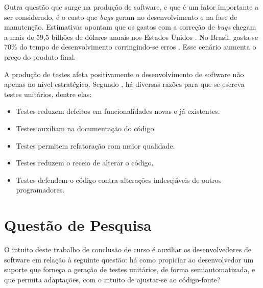 \par
\indent Outra questão que surge na produção de software, e que é um fator
importante a ser considerado, é o custo que \textit{bugs} geram no
desenvolvimento e na fase de manutenção. Estimativas apontam que os gastos
com a correção de \textit{bugs} chegam a mais de 59,5 bilhões de dólares
anuais nos Estados Unidos \cite{jantti2008}. No Brasil, gasta-se 70\% do
tempo de desenvolvimento corringindo-se erros \cite{janones2010}. Esse
cenário aumenta o preço do produto final.
\par
\indent A produção de testes afeta positivamente o desenvolvimento de
software não apenas no nível estratégico. Segundo ,
há diversas razões para que se escreva testes unitários, dentre elas:
\begin{itemize}
  \item Testes reduzem defeitos em funcionalidades novas e já existentes.

  \item Testes auxiliam na documentação do código.

  \item Testes permitem refatoração com maior qualidade.

  \item Testes reduzem o receio de alterar o código.

  \item Testes defendem o código contra alterações indesejáveis de outros
    programadores.
\end{itemize}

\section{Questão de Pesquisa}
O intuito deste trabalho de conclusão de curso é auxiliar os desenvolvedores
de software em relação à seguinte questão: há como propiciar ao desenvolvedor
um suporte que forneça a geração de testes unitários, de forma
semiautomatizada, e que permita adaptações, com o intuito de ajustar-se ao
código-fonte?

